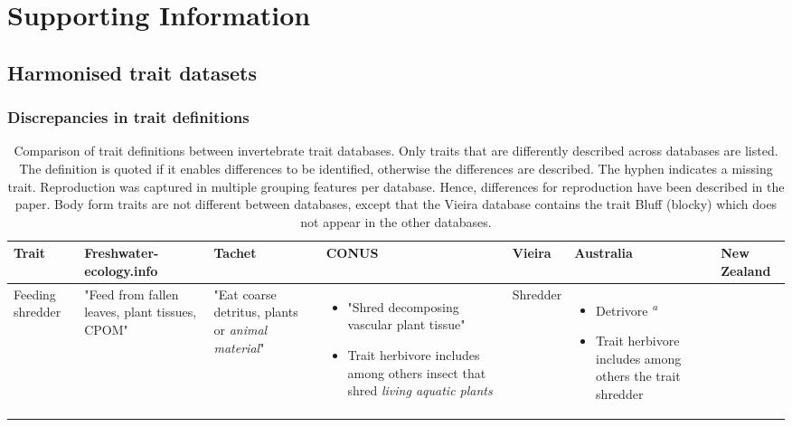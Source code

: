 \documentclass[../Draft_harmonization_paper.tex]{subfiles}
\begin{document}
\section*{Supporting Information}
\label{sec:SI}

\subsection*{Harmonised trait datasets}

\subsubsection*{Discrepancies in trait definitions}

\begin{landscape}
    \begin{longtable}{m{1.8cm}|m{3cm}|m{3cm}|m{3cm}|m{3cm}|m{3.2cm}|m{3cm}}
        \caption{Comparison of trait definitions between invertebrate trait databases. Only traits that are differently described across databases are listed. The definition is quoted if it enables differences to be identified, otherwise the differences are described. The hyphen indicates a missing trait. Reproduction was captured in multiple grouping features per database. Hence, differences for reproduction have been described in the paper. Body form traits are not different between databases, except that the Vieira database contains the trait Bluff (blocky) which does not appear in the other databases.}
        \label{stab:trait_definitions}
        \endfirsthead
        \toprule[.1em]
        Trait & \specialcell{Freshwater- \\ ecology.info} & Tachet & CONUS & Vieira & Australia & New Zealand \\
        \toprule[.1em]
        Feeding shredder & 
        "Feed from fallen leaves, plant tissues, CPOM" & 
        "Eat coarse detritus, plants or \textit{animal material}" & 
        \begin{itemize}
            \item "Shred decomposing vascular plant tissue"
            \item Trait herbivore includes among others insect that shred \textit{living aquatic plants} 
        \end{itemize} & 
        Shredder & 
        \begin{itemize}
            \item Detrivore \textsuperscript{\textit{a}}
            \item Trait herbivore includes among others the trait shredder

\end{itemize}
\end{longtable}
\end{landscape}
\end{document}
